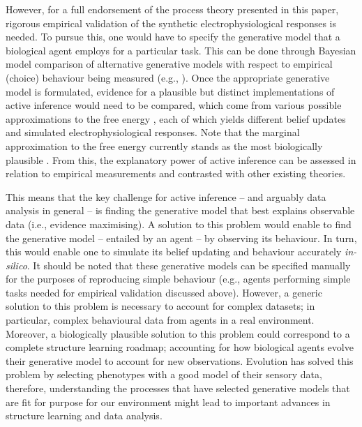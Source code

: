 \documentclass{article}
\begin{document}
However, for a full endorsement of the process theory presented in this paper, rigorous empirical validation of the synthetic electrophysiological responses is needed. To pursue this, one would have to specify the generative model that a biological agent employs for a particular task. This can be done through Bayesian model comparison of alternative generative models with respect to empirical (choice) behaviour being measured (e.g., \cite{mirzaHumanVisualExploration2018}). Once the appropriate generative model is formulated, evidence for a plausible but distinct implementations of active inference would need to be compared, which come from various possible approximations to the free energy \cite{parrNeuronalMessagePassing2019,schwobelActiveInferenceBelief2018,yedidiaConstructingFreeEnergyApproximations2005}, each of which yields different belief updates and simulated electrophysiological responses. Note that the marginal approximation to the free energy currently stands as the most biologically plausible \cite{parrNeuronalMessagePassing2019}. From this, the explanatory power of active inference can be assessed in relation to empirical measurements and contrasted with other existing theories.

This means that the key challenge for active inference -- and arguably data analysis in general -- is finding the generative model that best explains observable data (i.e., evidence maximising). A solution to this problem would enable to find the generative model -- entailed by an agent -- by observing its behaviour. In turn, this would enable one to simulate its belief updating and behaviour accurately \textit{in-silico}. It should be noted that these generative models can be specified manually for the purposes of reproducing simple behaviour (e.g., agents performing simple tasks needed for empirical validation discussed above). However, a generic solution to this problem is necessary to account for complex datasets; in particular, complex behavioural data from agents in a real environment. Moreover, a biologically plausible solution to this problem could correspond to a complete structure learning roadmap; accounting for how biological agents evolve their generative model to account for new observations. Evolution has solved this problem by selecting phenotypes with a good model of their sensory data, therefore, understanding the processes that have selected generative models that are fit for purpose for our environment might lead to important advances in structure learning and data analysis.
\end{document}
